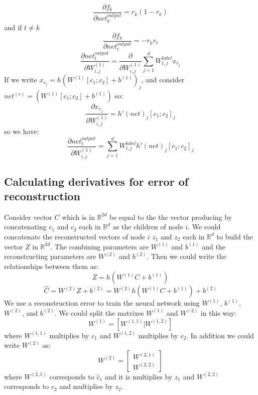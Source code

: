\documentclass[twoside,12pt]{article}
\begin{document}
\begin{equation}
\frac{\partial f_k}{\partial net^{output}_{k}}=r_k(1-r_k)
\end{equation}
and if $t\neq k$
\begin{equation}
\frac{\partial f_k}{\partial net^{output}_{t}}=-r_kr_t
\end{equation}
\begin{equation}
\frac{\partial net^{output}_t}{\partial W^{(1)}_{i,j}}=\frac{\partial}{\partial W^{(1)}_{i,j}}\sum_{j=1}^{d}W^{label}_{t,j}x_{r_j}
\end{equation}
If we write $x_{r_j}=h(W^{(1)}[c_1;c_2]+b^{(1)})_j$, and consider $net^{(r)}=(W^{(1)}[c_1;c_2]+b^{(1)})$ so:
\begin{equation}
\frac{\partial x_{r_j}}{\partial W^{(1)}_{i,j}}= h'(net)_j[c_1;c_2]_j
\end{equation}
so we have:
\begin{equation}
 \frac{\partial net^{output}_t}{\partial W^{(1)}_{i,j}}=\sum_{j=1}^{d}W^{label}_{t,j}h'(net)_j[c_1;c_2]_j
\end{equation}

\subsection{Calculating derivatives for error of reconstruction}
Consider vector $C$ which is in $\mathbb{R}^{2d}$ be equal to the the vector producing by concatenating $c_1$ and $c_2$ each in $\mathbb{R}^d$ as the children of node $i$. We could concatenate the reconstructed vectors of node $i$ $z_1$ and $z_2$ each in $\mathbb{R}^d$ to build the vector $Z$ in $\mathbb{R}^{2d}$. The combining parameters are $W^{(1)}$ and $b^{(1)}$ and the reconstructing parameters are $W^{(2)}$ and $b^{(2)}$. Then we could write the relationships between them as:
\begin{equation}
Z = h(W^{(1)}C+b^{(1)})
\end{equation}
\begin{equation}
\hat{C}=W^{(2)}Z+b^{(2)}=W^{(2)}h(W^{(1)}C+b^{(1)})+b^{(2)}
\end{equation}
We use a reconstruction error to train the neural network using $W^{(1)}$, $b^{(1)}$, $W^{(2)}$, and $b^{(2)}$. We could split the matrixes $W^{(1)}$ and $W^{(2)}$ in this way:
\begin{equation}
W^{(1)}=[W^{(1,1)}|W^{(1,2)}]
\end{equation}
where $W^{(1,1)}$ multiplies by $c_1$ and $W^{(1,2)}$ multiplies by $c_2$. In addition we could write $W^{(2)}$ as:
\begin{equation}
W^{(2)}=\begin{bmatrix}
     W^{(2,1)} \\ \hline
     W^{(2,2)}
    \end{bmatrix}
\end{equation} 
where $W^{(2,1)}$ corresponds to $\hat{c}_1$ and it is multiplies by $z_1$ and $W^{(2,2)}$ corresponds to $\hat{c}_2$ and multiplies by $z_2$.
\end{document}
